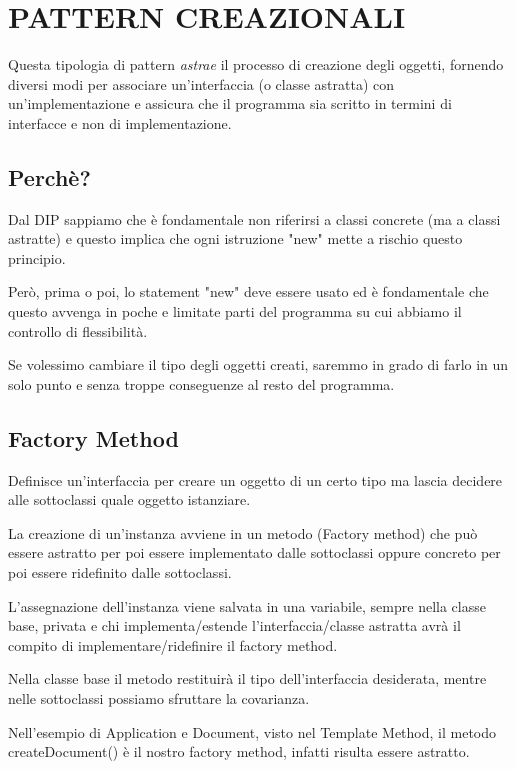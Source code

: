 \chapter{PATTERN CREAZIONALI}

Questa tipologia di pattern \textit{astrae} il processo di creazione degli oggetti, fornendo diversi modi per associare un’interfaccia (o classe astratta) con 
un’implementazione e assicura che il programma sia scritto in termini di interfacce e non di implementazione.

\section{Perchè?}

Dal DIP sappiamo che è fondamentale non riferirsi a classi concrete (ma a classi astratte) e questo implica che ogni istruzione "new" mette a rischio questo principio.

Però, prima o poi, lo statement "new" deve essere usato ed è fondamentale che questo avvenga in poche e limitate parti del programma su cui abbiamo il controllo di 
flessibilità.

Se volessimo cambiare il tipo degli oggetti creati, saremmo in grado di farlo in un solo punto e senza troppe conseguenze al resto del programma.

\section{Factory Method}

Definisce un’interfaccia per creare un oggetto di un certo tipo ma lascia decidere alle sottoclassi quale oggetto istanziare.

La creazione di un'instanza avviene in un metodo (Factory method) che può essere astratto per poi essere implementato dalle sottoclassi oppure concreto per poi 
essere ridefinito dalle sottoclassi.

L'assegnazione dell'instanza viene salvata in una variabile, sempre nella classe base, privata e chi implementa/estende l'interfaccia/classe astratta avrà il compito 
di implementare/ridefinire il factory method.

Nella classe base il metodo restituirà il tipo dell'interfaccia desiderata, mentre nelle sottoclassi possiamo sfruttare la covarianza.

Nell'esempio di Application e Document, visto nel Template Method, il metodo createDocument() è il nostro factory method, infatti risulta essere astratto.


